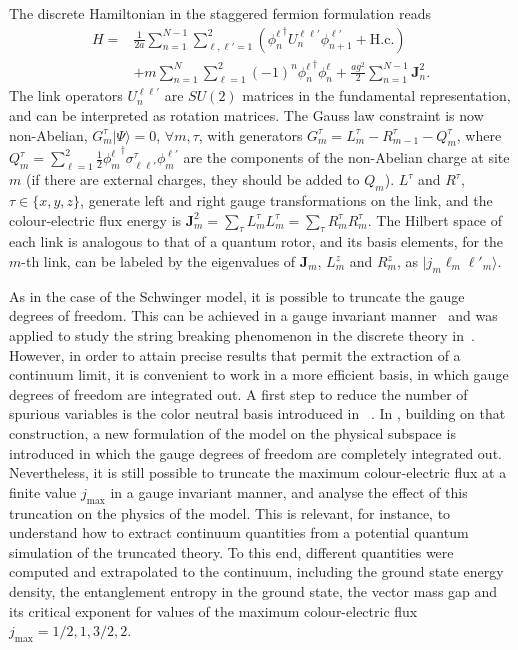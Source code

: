 \documentclass[epj,final]{svjour}
\begin{document}
The discrete Hamiltonian in the staggered fermion formulation reads  \cite{Kogut1975} 
\begin{eqnarray}
H=&\frac{1}{2a} \sum_{n=1}^{N-1}\sum_{\ell,\ell'=1}^2 \left({\phi_{n}^{\ell}}^\dagger U_{n}^{\ell\ell'}\phi_{n+1}^{\ell'}+\mathrm{H.c.}\right)
\nonumber \\
&+ m\sum_{n=1}^N\sum_{\ell=1}^2 (-1)^n{\phi_{n}^{\ell}}^\dagger\phi_{n}^{\ell} +\frac{ag^2}{2}\sum_{n=1}^{N-1} \mathbf{J}_{n}^2.
\label{eq:su2}
\end{eqnarray}
The link operators $U^{\ell\ell'}_n$ are $SU(2)$ matrices in the fundamental representation, and can be interpreted as rotation matrices. The Gauss law constraint is now non-Abelian, $G^\tau_m|\Psi\rangle=0$, $\forall m, \tau$, with generators $G^\tau_m =L^\tau_m-R^\tau_{m-1}-Q^\tau_m$, where $Q_m^\tau=\sum_{\ell=1}^2\frac{1}{2}{\phi_m^\ell}^\dagger\sigma^\tau_{\ell \ell'}\phi_m^{\ell'}$ are the components of the non-Abelian charge at site $m$ (if there are external charges, they should be added to $Q_m$). $L^\tau$ and $R^\tau$, $\tau\in\{x,y,z\}$, generate left and right gauge transformations on the link, and the colour-electric flux energy is $\mathbf{J}_{m}^2 = \sum_\tau L^\tau_mL^\tau_m = \sum_\tau R^\tau_mR^\tau_m$. The Hilbert space of each link is analogous to that of a quantum rotor, and its basis elements, for the $m$-th link, can be labeled  by the eigenvalues of $\mathbf{J}_{m}$, $L^{z}_m$ and $R^{z}_m$, as $ |j_m \ell_m \ell'_m\rangle$.

As in the case of the Schwinger model, it is possible to truncate the gauge degrees of freedom. This can be achieved in a gauge invariant manner~\cite{zohar2015quantum} and was applied to study the string breaking phenomenon in the discrete theory in~\cite{Kuehn2015}. However, in order to attain precise results that permit the extraction of a continuum limit, it is convenient to work in a more efficient basis, in which gauge degrees of freedom are integrated out. A first step to reduce the number of spurious variables is the color neutral basis introduced in ~\cite{Hamer1977,Hamer1982a}. In \cite{banuls2017efficient}, building on that construction, a new formulation of the model on the physical subspace is introduced in which the gauge degrees of freedom are completely integrated out. Nevertheless, it is still possible to truncate the maximum colour-electric flux at a finite value $j_{\mathrm{max}}$ in a gauge invariant manner, and analyse the effect of this truncation on the physics of the model. This is relevant, for instance, to understand how to extract continuum quantities from a potential quantum simulation of the truncated theory. To this end, different quantities were computed and extrapolated to the continuum, including the ground state energy density, the entanglement entropy in the ground state, the vector mass gap and its critical exponent for values of the maximum colour-electric flux $j_{\mathrm{max}}=1/2,1,3/2,2$. 
\end{document}
